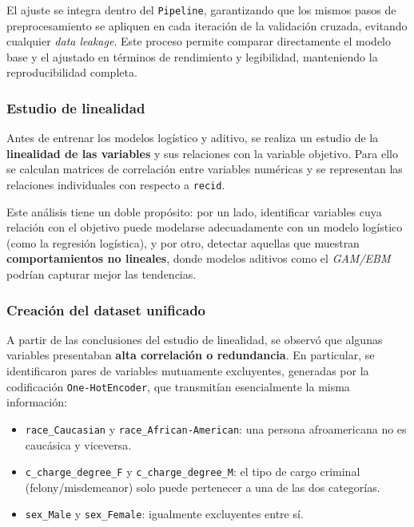 El ajuste se integra dentro del \texttt{Pipeline}, garantizando que los mismos pasos de preprocesamiento se apliquen en cada iteración de la validación cruzada, evitando cualquier \textit{data leakage}. Este proceso permite comparar directamente el modelo base y el ajustado en términos de rendimiento y legibilidad, manteniendo la reproducibilidad completa.

\subsubsection{Estudio de linealidad}
Antes de entrenar los modelos logístico y aditivo, se realiza un estudio de la \textbf{linealidad de las variables} y sus relaciones con la variable objetivo. Para ello se calculan matrices de correlación entre variables numéricas y se representan las relaciones individuales con respecto a \texttt{recid}. 

Este análisis tiene un doble propósito: por un lado, identificar variables cuya relación con el objetivo puede modelarse adecuadamente con un modelo logístico (como la regresión logística), y por otro, detectar aquellas que muestran \textbf{comportamientos no lineales}, donde modelos aditivos como el \textit{GAM/EBM} podrían capturar mejor las tendencias.

\subsubsection{Creación del dataset unificado}

A partir de las conclusiones del estudio de linealidad, se observó que algunas variables presentaban \textbf{alta correlación o redundancia}. En particular, se identificaron pares de variables mutuamente excluyentes, generadas por la codificación \texttt{One-HotEncoder}, que transmitían esencialmente la misma información:

\begin{itemize}
    \item \texttt{race\_Caucasian} y \texttt{race\_African-American}: una persona afroamericana no es caucásica y viceversa.
    \item \texttt{c\_charge\_degree\_F} y \texttt{c\_charge\_degree\_M}: el tipo de cargo criminal (felony/misdemeanor) solo puede pertenecer a una de las dos categorías.
    \item \texttt{sex\_Male} y \texttt{sex\_Female}: igualmente excluyentes entre sí.
\end{itemize}

